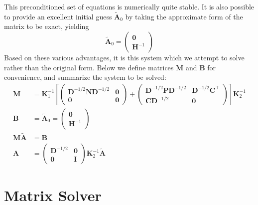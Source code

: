 This preconditioned set of equations is numerically quite stable.  It is also possible to provide an excellent initial guess $\mathbf{\widetilde{A}}_0$ by taking the approximate form of the matrix to be exact, yielding
\begin{equation}
\mathbf{\widetilde{A}}_0 = \begin{pmatrix}\mathbf{0}\\ \mathbf{H}^{-1}\end{pmatrix}
\end{equation}
Based on these various advantages, it is this system which we attempt to solve rather than the original form.  Below we define matrices $\mathbf{M}$ and $\mathbf{B}$ for convenience, and summarize the system to be solved:
\begin{subequations}\label{eqn:FinalPreconditionedSystem}\begin{align}
\mathbf{M} &= \mathbf{K}_1^{-1} 
\left[
\begin{pmatrix}\mathbf{D}^{-1/2}\mathbf{ND}^{-1/2}&\mathbf{0}\\ \mathbf{0}&\mathbf{0}\end{pmatrix}
+
\begin{pmatrix}\mathbf{D}^{-1/2}\mathbf{PD}^{-1/2}&\mathbf{D}^{-1/2}\mathbf{C}^\top \\ \mathbf{CD}^{-1/2}&\mathbf{0}\end{pmatrix}
\right]
\mathbf{K}_2^{-1}\\
\mathbf{B} &= \mathbf{\widetilde{A}}_0 = \begin{pmatrix}\mathbf{0}\\ \mathbf{H}^{-1}\end{pmatrix}\\
\mathbf{M\widetilde{A}} &= \mathbf{B}\\
\mathbf{A} &= \begin{pmatrix}\mathbf{D}^{-1/2}&\mathbf{0}\\ \mathbf{0}&\mathbf{I}\end{pmatrix}\mathbf{K}_2^{-1}\mathbf{\widetilde{A}}
\end{align}\end{subequations}


\section{Matrix Solver}\label{sec:MatrixSolverAlgorithm}

